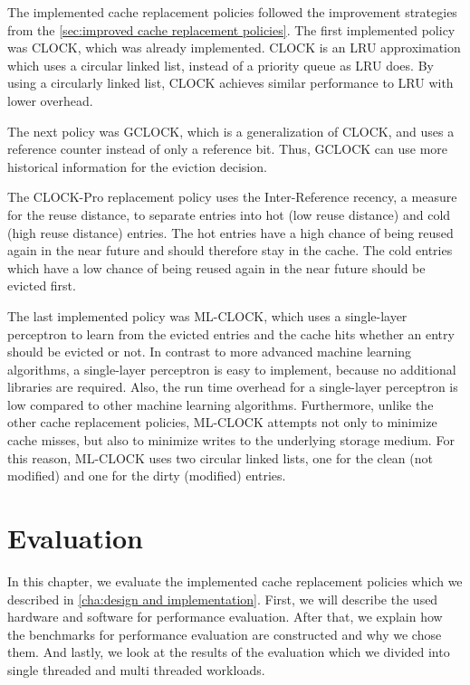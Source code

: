\documentclass[
	12pt,
	a4paper,
	abstract,
	bibliography=totoc,
	chapterprefix,
	headings=openright,
	numbers=endperiod,
	parskip=half,
	twoside,
]{scrreprt}
\begin{document}
The implemented cache replacement policies followed the improvement strategies from the \cref{sec:improved cache replacement policies}.
The first implemented policy was CLOCK, which was already implemented.
CLOCK is an LRU approximation which uses a circular linked list, instead of a priority queue as LRU does.
By using a circularly linked list, CLOCK achieves similar performance to LRU with lower overhead.

The next policy was GCLOCK, which is a generalization of CLOCK, and uses a reference counter instead of only a reference bit.
Thus, GCLOCK can use more historical information for the eviction decision.

The CLOCK-Pro replacement policy uses the Inter-Reference recency, a measure for the reuse distance, to separate entries into
hot (low reuse distance) and cold (high reuse distance) entries.
The hot entries have a high chance of being reused again in the near future and should therefore stay in the cache.
The cold entries which have a low chance of being reused again in the near future should be evicted first.

The last implemented policy was ML-CLOCK, which uses a single-layer perceptron to learn from the evicted entries and 
the cache hits whether an entry should be evicted or not.
In contrast to more advanced machine learning algorithms, a single-layer perceptron is easy to implement, because no additional libraries are required.
Also, the run time overhead for a single-layer perceptron is low compared to other machine learning algorithms.
Furthermore, unlike the other cache replacement policies, ML-CLOCK attempts not only to minimize cache misses,
but also to minimize writes to the underlying storage medium.
For this reason, ML-CLOCK uses two circular linked lists, one for the clean (not modified) 
and one for the dirty (modified) entries.

\chapter{Evaluation}
\label{cha:evaluation}

In this chapter, we evaluate the implemented cache replacement policies which we described in \cref{cha:design and implementation}.
First, we will describe the used hardware and software for performance evaluation.
After that, we explain how the benchmarks for performance evaluation are constructed and why we chose them.
And lastly, we look at the results of the evaluation which we divided into single threaded and multi threaded workloads.
\end{document}
